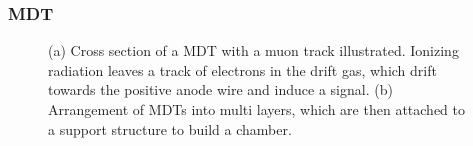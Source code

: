 \subsubsection{MDT} %

\begin{figure}[h!]
\captionsetup[subfigure]{position=b}
\centering
{}
\caption{(a) Cross section of a MDT with a muon track illustrated. Ionizing radiation leaves a track of electrons in the drift gas, which drift towards the positive anode wire and induce a signal. (b) Arrangement of MDTs into multi layers, which are then attached to a support structure to build a chamber.}
\label{fig:atlasMdtChamber}
\end{figure}

